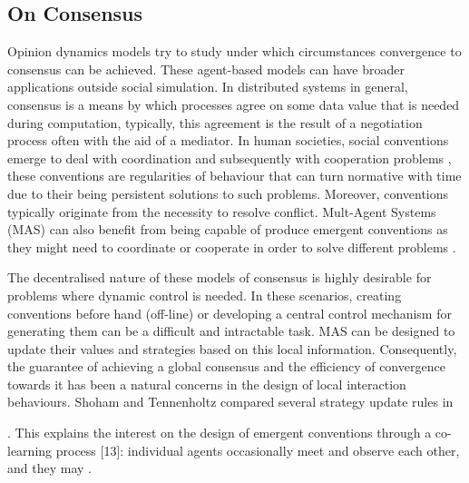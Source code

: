 \documentclass[preprint,number]{elsarticle}
\begin{document}
\subsection{On Consensus}
Opinion dynamics models try to study under which circumstances convergence to consensus can be achieved. These agent-based models can have broader applications outside social simulation. In distributed systems in general, consensus is a means by which processes agree on some data value that is needed during computation, typically, this agreement is the result of a negotiation process often with the aid of a mediator. In human societies, social conventions emerge to deal with coordination and subsequently with cooperation problems \cite{Lewis1969}, these conventions are regularities of behaviour that can turn normative with time due to their being persistent solutions to such problems. Moreover, conventions typically originate from the necessity to resolve conflict. Mult-Agent Systems (MAS) can also benefit from being capable of produce emergent conventions as they might need to coordinate or cooperate in order to solve different problems \cite{Delgado2002}. 

The decentralised nature of these models of consensus is highly desirable for problems where dynamic control is needed. In these scenarios, creating conventions before hand (off-line) or developing a central control mechanism for generating them can be a difficult and intractable task. MAS can be designed to update their values and strategies based on this local information. Consequently, the guarantee of achieving a global consensus and the efficiency of convergence towards it has been a natural concerns in the design of local interaction behaviours. Shoham and Tennenholtz compared several strategy update rules in %




. This explains the interest on the design of
emergent conventions through a co-learning process [13]: individual agents occasionally meet and observe each
other, and they may . 



\end{document}
